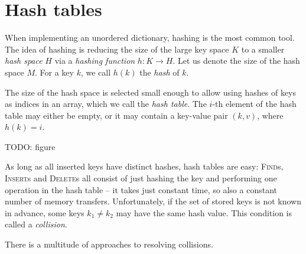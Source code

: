 \chapter{Hash tables}
When implementing an unordered dictionary, hashing is the most common tool.
The idea of hashing is reducing the size of the large key space $K$ to
a smaller \emph{hash space} $H$ via a \emph{hashing function}
$h\mathop{:}K\rightarrow H$.
Let us denote the size of the hash space $M$.
For a key $k$, we call $h(k)$ the \emph{hash} of $k$.

The size of the hash space is selected small enough to allow using hashes
of keys as indices in an array, which we call the \emph{hash table}.
The $i$-th element of the hash table may either be empty, or it may contain
a key-value pair $(k,v)$, where $h(k)=i$.

TODO: figure

As long as all inserted keys have distinct hashes, hash tables are easy:
\textsc{Find}s, \textsc{Insert}s and \textsc{Delete}s all consist of just
hashing the key and performing one operation in the hash table -- it takes just
constant time, so also a constant number of memory transfers.
Unfortunately, if the set of stored keys is not known in advance,
some keys $k_1\neq k_2$ may have the same hash value.
This condition is called a \emph{collision}.

There is a multitude of approaches to resolving collisions.

